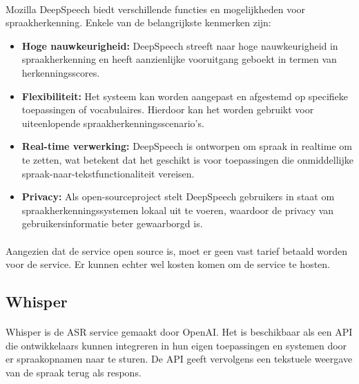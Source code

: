 \paragraph{}
Mozilla DeepSpeech biedt verschillende functies en mogelijkheden voor spraakherkenning. Enkele van de belangrijkste kenmerken zijn:

\begin{itemize}
    \item \textbf{Hoge nauwkeurigheid:} DeepSpeech streeft naar hoge nauwkeurigheid in spraakherkenning en heeft aanzienlijke vooruitgang geboekt in termen van herkenningsscores.

    \item \textbf{Flexibiliteit:} Het systeem kan worden aangepast en afgestemd op specifieke toepassingen of vocabulaires. Hierdoor kan het worden gebruikt voor uiteenlopende spraakherkenningsscenario's.

    \item \textbf{Real-time verwerking:} DeepSpeech is ontworpen om spraak in realtime om te zetten, wat betekent dat het geschikt is voor toepassingen die onmiddellijke spraak-naar-tekstfunctionaliteit vereisen.

    \item \textbf{Privacy:} Als open-sourceproject stelt DeepSpeech gebruikers in staat om spraakherkenningssystemen lokaal uit te voeren, waardoor de privacy van gebruikersinformatie beter gewaarborgd is.
\end{itemize}

\paragraph{}
Aangezien dat de service open source is, moet er geen vast tarief betaald worden voor de service. Er kunnen echter wel kosten komen om de service te hosten.

\subsection{Whisper}%

\paragraph{}
Whisper is de ASR service gemaakt door OpenAI. Het is beschikbaar als een API die ontwikkelaars kunnen integreren in hun eigen toepassingen en systemen door er spraakopnamen naar te sturen. De API geeft vervolgens een tekstuele weergave van de spraak terug als respons.

